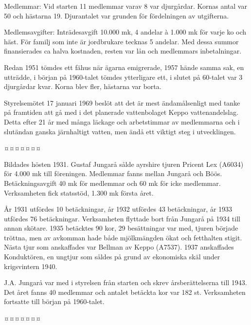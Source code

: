 Medlemmar: Vid starten 11 medlemmar varav 8 var djurgårdar. Kornas antal var 50 och hästarna 19. Djurantalet var grunden för fördelningen av utgifterna.

Medlemsavgifter: Inträdesavgift 10.000 mk, 4 andelar à 1.000 mk för varje ko och häst. För familj som inte är jordbrukare tecknas 5 andelar. Med dessa summor finansierades ca halva kostnaden, resten var lån och medlemmars inbetalningar.

Redan 1951 tömdes ett fähus när ägarna emigrerade, 1957 hände samma sak, en utträdde, i början på 1960-talet tömdes ytterligare ett, i slutet  på  60-talet var 3 djurgårdar kvar. Korna blev fler, hästarna var borta.

Styrelsemötet 17 januari 1969 beslöt att det är mest ändamålsenligt med tanke på framtiden att gå med i det 	planerade vattenbolaget Keppo vattenandelslag. Detta efter 21 år med många läckage och arbetstimmar av 	medlemmarna och i slutändan ganska järnhaltigt vatten, men ändå ett viktigt steg i utvecklingen.

                                    ¤¤¤¤¤¤¤




Bildades hösten 1931. Gustaf Jungarå sålde ayrshire tjuren Pricent Lex (A6034) för 4.000 mk till 	föreningen. Medlemmar fanns mellan Jungarå och Böös. Betäckningsavgift 40 mk för medlemmar och 60 mk för icke	medlemmar. 	Verksamheten fick statsstöd, 1.300 mk första året.

År 1931 utfördes 10 betäckningar, år 1932 utfördes 43 betäckningar, år 1933 utfördes 76 betäckningar. 	Verksamheten flyttade bort från Jungarå på 1934 till annan skötare. 1935 betäcktes 90 kor, 29 besättningar var med, tjuren började tröttna, men av avkomman hade både mjölkmängden ökat och fetthalten stigit. Nästa tjur som anskaffades var Bellman av Keppo (A7537). 1937 anskaffades Konduktören,  en ungtjur som såldes på grund av ekonomiska skäl under krigsvintern 1940.

J.A. Jungarå var med i styrelsen från starten och skrev årsberättelserna till 1943. Det året fanns 40 medlemmar och antalet betäckta kor var 182 st. Verksamheten fortsatte till början 	på 1960-talet.

                                    ¤¤¤¤¤¤¤



